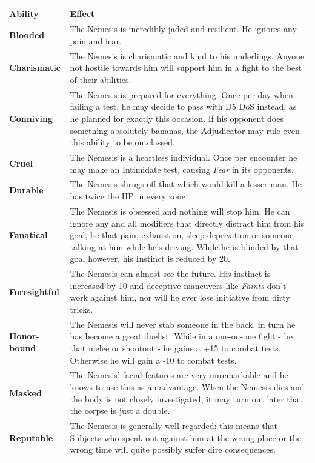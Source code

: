 \documentclass[12pt,a4paper,openany,usenames,dvipsnames]{book}
\begin{document}
	{\setlength{\extrarowheight}{5pt}
	\begin{tabularx}{\textwidth}{l|X}
		Ability & Effect\\
		\hline
		\textbf{Blooded} & The Nemesis is incredibly jaded and resilient. He ignores any pain and fear.\\
		\hline
		\textbf{Charismatic} & The Nemesis is charismatic and kind to his underlings. Anyone not hostile towards him will support him in a fight to the best of their abilities.\\
		\hline
		\textbf{Conniving} & The Nemesis is prepared for everything.
			Once per day when failing a test, he may decide to pass with D5 DoS instead, as he planned for exactly this occasion.
			If his opponent does something absolutely bananas, the Adjudicator may rule even this ability to be outclassed.\\
		\hline
		\textbf{Cruel} & The Nemesis is a heartless individual. Once per encounter he may make an Intimidate test, causing \emph{Fear} in its opponents.\\
		\hline
		\textbf{Durable} & The Nemesis shrugs off that which would kill a lesser man. He has twice the HP in every zone.\\
		\hline
		\textbf{Fanatical} & The Nemesis is obsessed and nothing will stop him. He can ignore any and all modifiers that directly distract him from his goal, be that pain, exhaustion, sleep deprivation or someone talking at him while he's driving. While he is blinded by that goal however, his Instinct is reduced by 20.\\
		\hline
		\textbf{Foresightful} & The Nemesis can almost see the future. His instinct is increased by 10 and deceptive maneuvers like \emph{Faints} don't work against him, nor will he ever lose initiative from dirty tricks.\\
		\hline
		\textbf{Honor-bound} & The Nemesis will never stab someone in the back, in turn he has become a great duelist. While in a one-on-one fight - be that melee or shootout - he gains a +15 to combat tests. Otherwise he will gain a -10 to combat tests.\\
		\hline
		\textbf{Masked} & The Nemesis' facial features are very unremarkable and he knows to use this as an advantage. When the Nemesis dies and the body is not closely investigated, it may turn out later that the corpse is just a double.\\
		\hline
		\textbf{Reputable} & The Nemesis is generally well regarded; this means that Subjects who speak out against him at the wrong place or the wrong time will quite possibly suffer dire consequences.
	\end{tabularx}}
	
\end{document}
